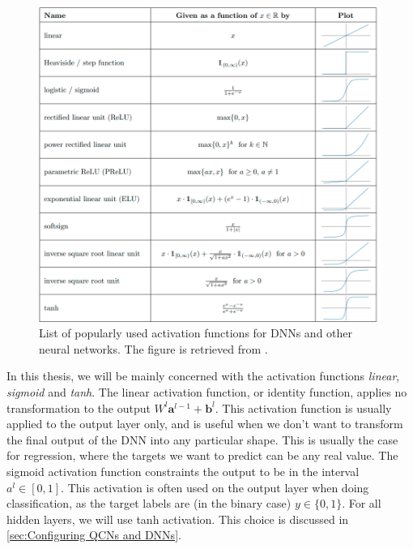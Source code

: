 \begin{figure}[H]
    \centering
    \includegraphics[width=12cm]{latex/figures/activations.png}
    \caption{List of popularly used activation functions for DNNs and other neural networks. The figure is retrieved from \citet{DBLP:journals/corr/abs-2105-04026}.}
    \label{fig:activation function}
\end{figure}

In this thesis, we will be mainly concerned with the activation functions \emph{linear}, \emph{sigmoid} and \emph{tanh}. The linear activation function, or identity function, applies no transformation to the output $W^l \boldsymbol{a}^{l-1} + \boldsymbol{b}^l$. This activation function is usually applied to the output layer only, and is useful when we don't want to transform the final output of the DNN into any particular shape. This is usually the case for regression, where the targets we want to predict can be any real value. The sigmoid activation function constraints the output to be in the interval $a^l \in [0, 1]$. This activation is often used on the output layer when doing classification, as the target labels are (in the binary case) $y \in \{0,1\}$. For all hidden layers, we will use tanh activation. This choice is discussed in \autoref{sec:Configuring QCNs and DNNs}. 


